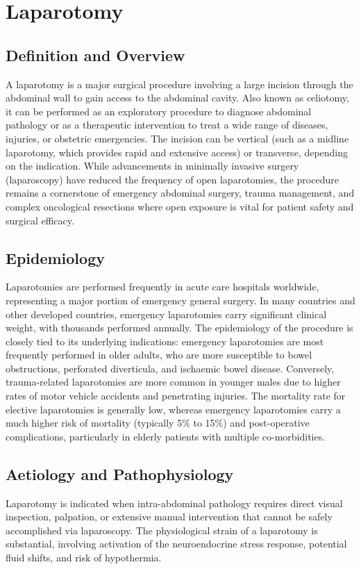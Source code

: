 \chapter{Laparotomy}

\section*{Definition and Overview}
A laparotomy is a major surgical procedure involving a large incision through the abdominal wall to gain access to the abdominal cavity. Also known as celiotomy, it can be performed as an exploratory procedure to diagnose abdominal pathology or as a therapeutic intervention to treat a wide range of diseases, injuries, or obstetric emergencies. The incision can be vertical (such as a midline laparotomy, which provides rapid and extensive access) or transverse, depending on the indication. While advancements in minimally invasive surgery (laparoscopy) have reduced the frequency of open laparotomies, the procedure remains a cornerstone of emergency abdominal surgery, trauma management, and complex oncological resections where open exposure is vital for patient safety and surgical efficacy.

\section*{Epidemiology}
Laparotomies are performed frequently in acute care hospitals worldwide, representing a major portion of emergency general surgery. In many countries and other developed countries, emergency laparotomies carry significant clinical weight, with thousands performed annually. The epidemiology of the procedure is closely tied to its underlying indications: emergency laparotomies are most frequently performed in older adults, who are more susceptible to bowel obstructions, perforated diverticula, and ischaemic bowel disease. Conversely, trauma-related laparotomies are more common in younger males due to higher rates of motor vehicle accidents and penetrating injuries. The mortality rate for elective laparotomies is generally low, whereas emergency laparotomies carry a much higher risk of mortality (typically 5\% to 15\%) and post-operative complications, particularly in elderly patients with multiple co-morbidities.

\section*{Aetiology and Pathophysiology}
Laparotomy is indicated when intra-abdominal pathology requires direct visual inspection, palpation, or extensive manual intervention that cannot be safely accomplished via laparoscopy. The physiological strain of a laparotomy is substantial, involving activation of the neuroendocrine stress response, potential fluid shifts, and risk of hypothermia.

